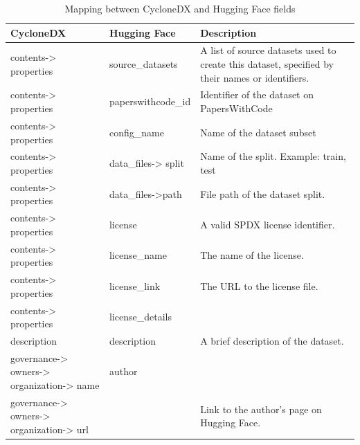 \documentclass[12pt,a4paper, oneside, openright]{book}
\begin{document}
\begin{table}[h!]
    \centering
    \begin{tabular}{|p{5cm}|p{4cm}|p{4cm}|}
        \hline
        \textbf{CycloneDX} & \textbf{Hugging Face} & \textbf{Description}\\ \hline
           contents-> properties  
           & source\_datasets
           & A list of source datasets used to create this dataset, specified by their names or identifiers.
        \\ \hline
            contents-> properties
            & paperswithcode\_id
            & Identifier of the dataset on PapersWithCode
        \\ \hline   
            contents-> properties   
           & config\_name
           & Name of the dataset subset
        \\ \hline
            contents-> properties
            & data\_files-> split
            & Name of the split. Example: train, test
        \\ \hline 
             contents-> properties       
            & data\_files->path
            & File path of the dataset split.
        \\ \hline 
            contents-> properties        
            & license
            & A valid SPDX license identifier.
        \\ \hline
             contents-> properties       
            & license\_name
            & The name of the license.
        \\ \hline
            contents-> properties        
            & license\_link
            & The URL to the license file.
        \\ \hline 
            contents-> properties        
            & license\_details
            & 
        \\ \hline
            description     
            & description
            & A brief description of the dataset.
        \\ \hline
            governance-> owners-> organization-> name       
            & author
            & 
        \\ \hline
            governance-> owners-> organization-> url     
            & 
            & Link to the author's page on Hugging Face.
        \\ \hline
        
            
    \end{tabular}
\caption{Mapping between CycloneDX and Hugging Face fields}
    \label{tab:cyclonedx_huggingface}
\end{table}
\clearpage
\end{document}
